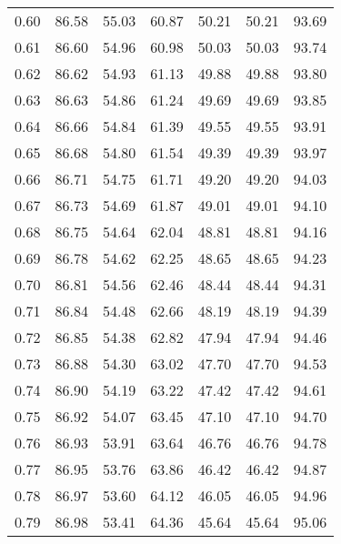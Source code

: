 \begin{tabular}{|c|c|c|c|c|c|c|}
      0.60 &     86.58 &     55.03 &      60.87 &   50.21 &      50.21 &         93.69 \\
      0.61 &     86.60 &     54.96 &      60.98 &   50.03 &      50.03 &         93.74 \\
      0.62 &     86.62 &     54.93 &      61.13 &   49.88 &      49.88 &         93.80 \\
      0.63 &     86.63 &     54.86 &      61.24 &   49.69 &      49.69 &         93.85 \\
      0.64 &     86.66 &     54.84 &      61.39 &   49.55 &      49.55 &         93.91 \\
      0.65 &     86.68 &     54.80 &      61.54 &   49.39 &      49.39 &         93.97 \\
      0.66 &     86.71 &     54.75 &      61.71 &   49.20 &      49.20 &         94.03 \\
      0.67 &     86.73 &     54.69 &      61.87 &   49.01 &      49.01 &         94.10 \\
      0.68 &     86.75 &     54.64 &      62.04 &   48.81 &      48.81 &         94.16 \\
      0.69 &     86.78 &     54.62 &      62.25 &   48.65 &      48.65 &         94.23 \\
      0.70 &     86.81 &     54.56 &      62.46 &   48.44 &      48.44 &         94.31 \\
      0.71 &     86.84 &     54.48 &      62.66 &   48.19 &      48.19 &         94.39 \\
      0.72 &     86.85 &     54.38 &      62.82 &   47.94 &      47.94 &         94.46 \\
      0.73 &     86.88 &     54.30 &      63.02 &   47.70 &      47.70 &         94.53 \\
      0.74 &     86.90 &     54.19 &      63.22 &   47.42 &      47.42 &         94.61 \\
      0.75 &     86.92 &     54.07 &      63.45 &   47.10 &      47.10 &         94.70 \\
      0.76 &     86.93 &     53.91 &      63.64 &   46.76 &      46.76 &         94.78 \\
      0.77 &     86.95 &     53.76 &      63.86 &   46.42 &      46.42 &         94.87 \\
      0.78 &     86.97 &     53.60 &      64.12 &   46.05 &      46.05 &         94.96 \\
      0.79 &     86.98 &     53.41 &      64.36 &   45.64 &      45.64 &         95.06 \\

\end{tabular}
